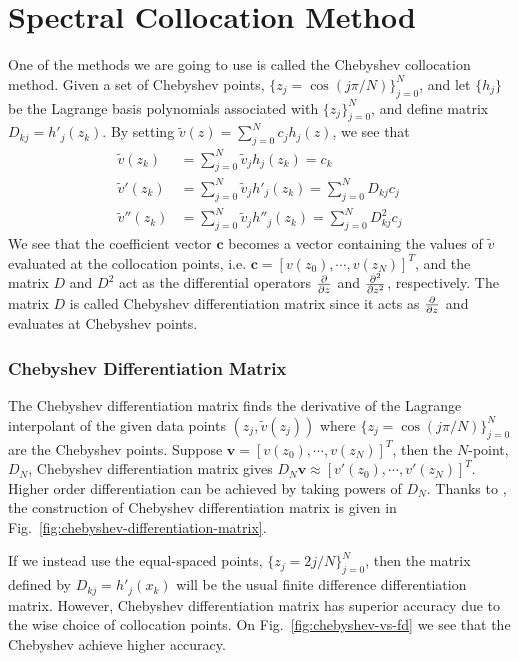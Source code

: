 \section{Spectral Collocation Method}
One of the methods we are going to use is called the Chebyshev collocation method.
Given a set of Chebyshev points, $\{z_j=\cos(j\pi/N)\}_{j=0}^{N}$, and let $\{h_j\}$ be the Lagrange basis polynomials associated with $\{z_j\}_{j=0}^{N}$, and define matrix $D_{kj} = h'_j(z_k)$. By setting $\tilde{v}(z) = \sum_{j=0}^{N}c_jh_j(z)$, we see that
\begin{align}
	\tilde{v}(z_k)   & = \sum_{j=0}^{N}\tilde{v}_jh_j(z_k) = c_k                         \\
	\tilde{v}'(z_k)  & = \sum_{j=0}^{N}\tilde{v}_jh'_j(z_k) = \sum_{j=0}^{N}D_{kj}c_j    \\
	\tilde{v}''(z_k) & = \sum_{j=0}^{N}\tilde{v}_jh''_j(z_k) = \sum_{j=0}^{N}D^2_{kj}c_j
\end{align}
We see that the coefficient vector $\mathbf{c}$ becomes a vector containing the values of $\tilde{v}$ evaluated at the collocation points, i.e. $\mathbf{c}=[v(z_0), \cdots, v(z_N)]^T$, and the matrix $D$ and $D^2$ act as the differential operators $\pdv{z}$ and $\pdv[2]{z}$, respectively. The matrix $D$ is called Chebyshev differentiation matrix since it acts as $\pdv{z}$ and evaluates at Chebyshev points.

\subsubsection*{Chebyshev Differentiation Matrix}
The Chebyshev differentiation matrix finds the derivative of the Lagrange interpolant of the given data points $(z_j,\tilde{v}(z_j))$ where $\{z_j = \cos(j\pi/N)\}_{j=0}^{N}$ are the Chebyshev points. Suppose $\mathbf{v} = [v(z_0), \cdots, v(z_N)]^T$, then the $N$-point, $D_N$, Chebyshev differentiation matrix gives $D_N\mathbf{v} \approx [v'(z_0),\cdots, v'(z_N)]^T$. Higher order differentiation can be achieved by taking powers of $D_N$. Thanks to \cite{trefethen_spectral_2000}, the construction of Chebyshev differentiation matrix is given in Fig.~\ref{fig:chebyshev-differentiation-matrix}.

If we instead use the equal-spaced points, $\{z_j=2j/N\}_{j=0}^{N}$, then the matrix defined by $D_{kj} = h'_j(x_k)$ will be the usual finite difference differentiation matrix. However, Chebyshev differentiation matrix has superior accuracy due to the wise choice of collocation points. On Fig.~\ref{fig:chebyshev-vs-fd} we see that the Chebyshev achieve higher accuracy.


